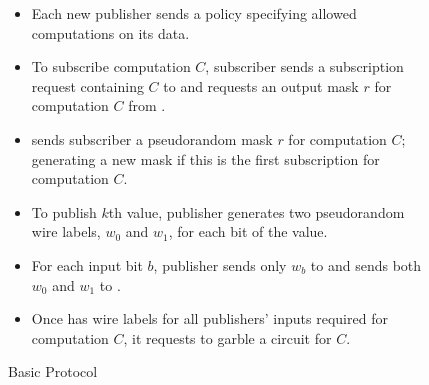 \begin{figure}[h]
	\caption{Basic Protocol}
\label{fig:basicprotocol}
\begin{mdframed}[style=myframe]


\initialize
\begin{itemize}[leftmargin=*]
 
	\item Each new publisher sends \broker a policy specifying allowed
		computations on its data.


\end{itemize}

\subscribe
\begin{itemize}[leftmargin=*]

	\item To subscribe computation $C$, subscriber sends a subscription request
		containing $C$ to \broker and requests an output mask $r$ for computation
		$C$ from \garbler.

	\item \garbler sends subscriber a pseudorandom mask $r$ for computation $C$;
		generating a new mask if this is the first subscription for computation
		$C$.

\end{itemize}

\publish
\begin{itemize}[leftmargin=*]
		
	\item To publish $k$th value, publisher generates two pseudorandom wire
		labels, $w_0$ and $w_1$, for each bit of the value. 
		
	\item For each input bit $b$, publisher sends only $w_b$ to \broker and sends
		both $w_0$ and $w_1$ to \garbler.

\end{itemize}

\compute
\begin{itemize}[leftmargin=*]

	\item Once \broker has wire labels for all publishers' inputs required for
		computation $C$, it requests \garbler to garble a circuit for $C$.  
  

\end{itemize}
\end{mdframed}
\end{figure}
